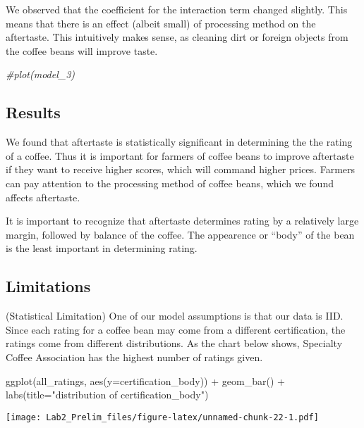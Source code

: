 \documentclass[
]{article}
\newenvironment{Shaded}{\begin{snugshade}}{\end{snugshade}}
\newcommand{\AttributeTok}[1]{\textcolor[rgb]{0.77,0.63,0.00}{#1}}
\newcommand{\CommentTok}[1]{\textcolor[rgb]{0.56,0.35,0.01}{\textit{#1}}}
\newcommand{\FunctionTok}[1]{\textcolor[rgb]{0.00,0.00,0.00}{#1}}
\newcommand{\NormalTok}[1]{#1}
\newcommand{\SpecialCharTok}[1]{\textcolor[rgb]{0.00,0.00,0.00}{#1}}
\newcommand{\StringTok}[1]{\textcolor[rgb]{0.31,0.60,0.02}{#1}}
\begin{document}
We observed that the coefficient for the interaction term changed
slightly. This means that there is an effect (albeit small) of
processing method on the aftertaste. This intuitively makes sense, as
cleaning dirt or foreign objects from the coffee beans will improve
taste.

\begin{Shaded}
\begin{Highlighting}[]
\CommentTok{\#plot(model\_3)}
\end{Highlighting}
\end{Shaded}

\hypertarget{results}{%
\subsection{Results}\label{results}}

We found that aftertaste is statistically significant in determining the
the rating of a coffee. Thus it is important for farmers of coffee beans
to improve aftertaste if they want to receive higher scores, which will
command higher prices. Farmers can pay attention to the processing
method of coffee beans, which we found affects aftertaste.

It is important to recognize that aftertaste determines rating by a
relatively large margin, followed by balance of the coffee. The
appearence or ``body'' of the bean is the least important in determining
rating.

\hypertarget{limitations}{%
\subsection{Limitations}\label{limitations}}

(Statistical Limitation) One of our model assumptions is that our data
is IID. Since each rating for a coffee bean may come from a different
certification, the ratings come from different distributions. As the
chart below shows, Specialty Coffee Association has the highest number
of ratings given.

\begin{Shaded}
\begin{Highlighting}[]
\FunctionTok{ggplot}\NormalTok{(all\_ratings, }\FunctionTok{aes}\NormalTok{(}\AttributeTok{y=}\NormalTok{certification\_body)) }\SpecialCharTok{+} \FunctionTok{geom\_bar}\NormalTok{() }\SpecialCharTok{+} \FunctionTok{labs}\NormalTok{(}\AttributeTok{title=}\StringTok{"distribution of certification\_body"}\NormalTok{)}
\end{Highlighting}
\end{Shaded}

\texttt{[image: Lab2\_Prelim\_files/figure-latex/unnamed-chunk-22-1.pdf]}
\end{document}

